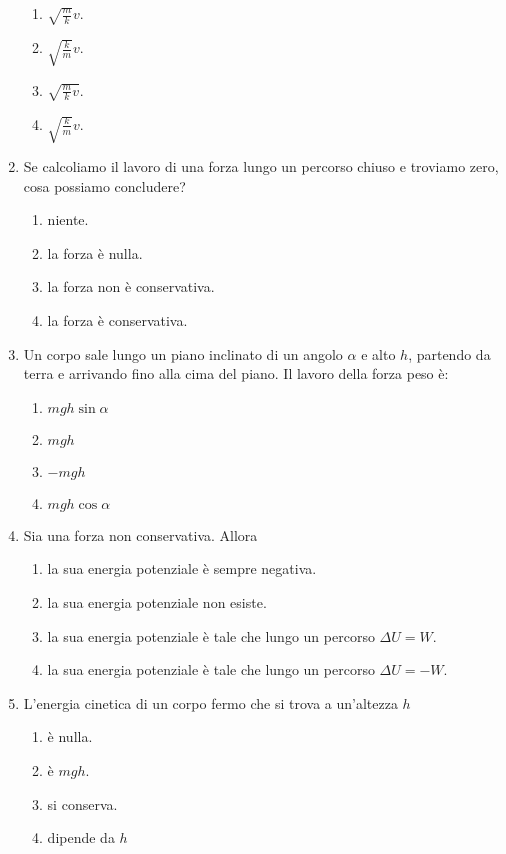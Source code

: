 \documentclass{article}
\begin{document}
\begin{enumerate}
\begin{enumerate}[label=\Alph*.]
    \item $\sqrt{\frac{m}{k}}v$.
    \item $\sqrt{\frac{k}{m}}v$.
    \item $\sqrt{\frac{m}{k}v}$.
    \item $\sqrt{\frac{k}{m}}v$.
  \end{enumerate}
  \item Se calcoliamo il lavoro di una forza lungo un percorso chiuso e troviamo zero, cosa possiamo concludere?
  \begin{enumerate}[label=\Alph*.]
    \item niente.
    \item la forza è nulla.
    \item la forza non è conservativa.
    \item la forza è conservativa.
  \end{enumerate}
  \item Un corpo sale lungo un piano inclinato di un angolo $\alpha$ e alto $h$, partendo da terra e arrivando fino alla cima del piano. Il lavoro della forza peso è:
  \begin{enumerate}[label=\Alph*.]
    \item $mgh\sin\alpha$
    \item $mgh$
    \item $-mgh$
    \item $mgh\cos\alpha$
  \end{enumerate}
  \item Sia  una forza non conservativa. Allora
  \begin{enumerate}[label=\Alph*.]
    \item la sua energia potenziale è sempre negativa.
    \item la sua energia potenziale non esiste.
    \item la sua energia potenziale è tale che lungo un percorso $\Delta U=W$.
    \item la sua energia potenziale è tale che lungo un percorso $\Delta U=-W$.
  \end{enumerate}
  \item L'energia cinetica di un corpo fermo che si trova a un'altezza $h$
  \begin{enumerate}[label=\Alph*.]
    \item è nulla.
    \item è $mgh$.
    \item si conserva.
    \item dipende da $h$
  \end{enumerate}

\end{enumerate}
\end{document}
